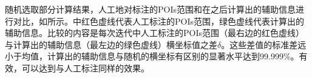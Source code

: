 {{	%
	随机选取部分计算结果，人工地对标注的POIs范围和在\poifanwei 之后计算出的辅助信息进行对比，如所示。中红色虚线代表人工标注的POIs范围，绿色虚线代表计算出的辅助信息。比较的内容是每次迭代中人工标注的POIs范围（最右边的红色虚线）与计算出的辅助信息（最左边的绿色虚线）横坐标值之差$\delta$。这些差值的标准差远小于均值，计算出的辅助信息与随机的横坐标有区别的显著水平达到99.999\%。\poifanwei 有效，可以达到与人工标注同样的效果。
	
}}
